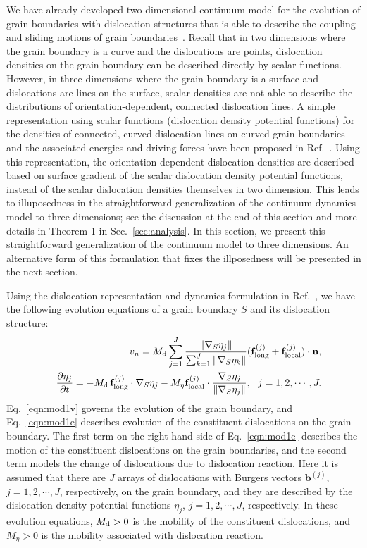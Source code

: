 We have already  developed two dimensional continuum model for the evolution of grain boundaries with dislocation structures that is able to describe the coupling and sliding motions of grain boundaries~\cite{zhang2018motion,zhang2019new}.  Recall that in two dimensions where the grain boundary is a curve and the dislocations are points, dislocation densities on the grain boundary can be described directly by scalar functions. However, in three dimensions where the grain boundary is a surface and dislocations are lines on the surface, scalar densities are not able to describe the distributions of orientation-dependent, connected dislocation lines.
A simple representation  using scalar functions (dislocation density potential functions) for the densities of connected, curved dislocation lines on curved grain boundaries and the associated energies and driving forces have been proposed in Ref.~\cite{zhu2014continuum}.
   Using this representation, the orientation dependent dislocation densities are described based on surface gradient of the scalar dislocation density potential functions, instead of the scalar dislocation densities themselves in two dimension. This leads to illuposedness in the straightforward generalization of the continuum dynamics model to three dimensions;
see the discussion at the end of this section and more details in Theorem 1 in Sec.~\ref{sec:analysis}. In this section, we  present this straightforward generalization of the continuum model to three dimensions. An alternative form of this formulation that fixes the illposedness will be presented in the next section.

Using the dislocation representation and dynamics formulation in  Ref.~\cite{zhu2014continuum}, we have the following evolution equations of a grain boundary $S$ and its dislocation structure:
\begin{eqnarray}
&&v_n= M_\mathrm{d}\sum_{j=1}^J\frac{\|\nabla_S \eta_j\|}{\sum_{k=1}^J\|\nabla_S \eta_k\|}(\mathbf{f}^{(j)}_{\mathrm{long}}+\mathbf{f}^{(j)}_{\mathrm{local}})\cdot\mathbf{n}, \label{eqn:mod1v}\\
&& \frac{\partial \eta_j}{\partial t}=-M_{\rm d} \, \mathbf{f}^{(j)}_{\mathrm{long}}\cdot\nabla_S\eta_j
-M_\eta \mathbf{f}^{(j)}_{\mathrm{local}}\cdot\frac{\nabla_S \eta_j}{\|\nabla_S \eta_j\|}, \ \ j=1,2,\cdots,J.\label{eqn:mod1e}
\end{eqnarray}
Eq.~\eqref{eqn:mod1v} governs the evolution of the grain boundary, and Eq.~\eqref{eqn:mod1e} describes evolution of the constituent dislocations on the grain boundary. The first term on the right-hand side of Eq.~\eqref{eqn:mod1e} describes the motion of the constituent dislocations on the grain boundaries, and the second term models the change of dislocations due to dislocation reaction. Here it is assumed that  there are $J$ arrays of dislocations with Burgers vectors $\mathbf b^{(j)}$, $j=1,2,\cdots,J$, respectively, on the grain boundary, and they are described by the dislocation density potential functions $\eta_j$,  $j=1,2,\cdots,J$, respectively. In these evolution equations, $M_{\rm d}>0$ is the mobility of the constituent dislocations, and $M_\eta>0$ is the mobility associated with dislocation reaction.

